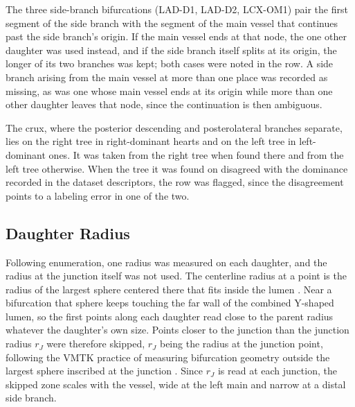 The three side-branch bifurcations (LAD-D1, LAD-D2, LCX-OM1) pair the first segment of the side branch with the segment of the main vessel that continues past the side branch's origin.
If the main vessel ends at that node, the one other daughter was used instead, and if the side branch itself splits at its origin, the longer of its two branches was kept; both cases were noted in the row.
A side branch arising from the main vessel at more than one place was recorded as missing, as was one whose main vessel ends at its origin while more than one other daughter leaves that node, since the continuation is then ambiguous.

The crux, where the posterior descending and posterolateral branches separate, lies on the right tree in right-dominant hearts and on the left tree in left-dominant ones.
It was taken from the right tree when found there and from the left tree otherwise.
When the tree it was found on disagreed with the dominance recorded in the dataset descriptors, the row was flagged, since the disagreement points to a labeling error in one of the two.

\subsection{Daughter Radius}
\label{sec:daughter-ratio-radius}

Following enumeration, one radius was measured on each daughter, and the radius at the junction itself was not used.
The centerline radius at a point is the radius of the largest sphere centered there that fits inside the lumen \cite{antiga2008vmtk}.
Near a bifurcation that sphere keeps touching the far wall of the combined Y-shaped lumen, so the first points along each daughter read close to the parent radius whatever the daughter's own size.
Points closer to the junction than the junction radius $r_J$ were therefore skipped, $r_J$ being the radius at the junction point, following the VMTK practice of measuring bifurcation geometry outside the largest sphere inscribed at the junction \cite{antiga2008vmtk}.
Since $r_J$ is read at each junction, the skipped zone scales with the vessel, wide at the left main and narrow at a distal side branch.

